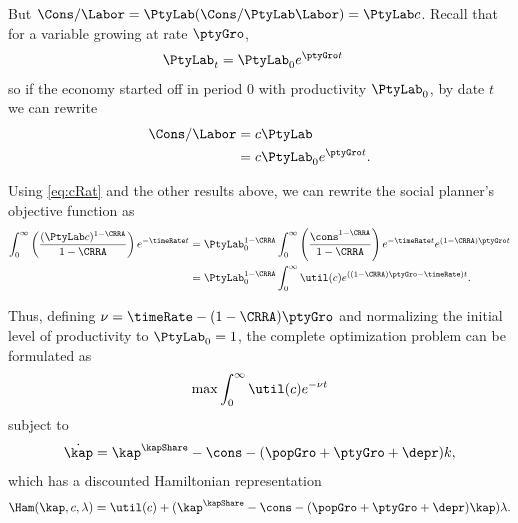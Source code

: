 \documentclass{handout}
\begin{document}
But $\Cons/\Labor = \PtyLab (\Cons/\PtyLab \Labor)= \PtyLab c$.  Recall that for a variable growing at rate $\ptyGro$,
\begin{equation}\begin{gathered}\begin{aligned}
  \PtyLab _{t} & =  \PtyLab _{0}e^{\ptyGro t}
\end{aligned}\end{gathered}\end{equation}
so if the economy started off in period 0 with productivity $\PtyLab_{0}$, by date $t$ we can rewrite
\begin{equation}\begin{gathered}\begin{aligned}
  \Cons/\Labor & =  c\PtyLab   \\
               & =  c\PtyLab _{0}e^{\ptyGro t}. \label{eq:cRat}
\end{aligned}\end{gathered}\end{equation}

Using \eqref{eq:cRat} and the other results above, we can rewrite the social planner's objective function as
\begin{equation}\begin{gathered}\begin{aligned}
  \int_{0}^{\infty} \left(\frac{(\PtyLab c)^{1-\CRRA}}{1-\CRRA}\right) e^{-\timeRate  t} & =  
                                                                                               \PtyLab _{0}^{1-\CRRA}\int_{0}^{\infty} \left(\frac{\cons^{1-\CRRA}}{1-\CRRA}\right) e^{-\timeRate  t}e^{(1-\CRRA)\ptyGro  t} 
  \\ & =  \PtyLab _{0}^{1-\CRRA}\int_{0}^{\infty} \util(c) e^{\left((1-\CRRA)\ptyGro -\timeRate \right) t}
           .
           \label{eq:maxprobmod}
\end{aligned}\end{gathered}\end{equation}

Thus, defining $\nu = \timeRate  - (1-\CRRA) \ptyGro$ and normalizing the initial
level of productivity to $\PtyLab _{0}=1$, the complete optimization problem
can be formulated as
\begin{equation}
  \max \int_{0}^{\infty} \util(c) e^{-\nu  t}
\end{equation}
subject to
\begin{equation}
  \dot{\kap} = \kap^{\kapShare}-\cons-(\popGro+\ptyGro+\depr)k,
\end{equation}
which has a discounted Hamiltonian representation
\begin{equation}
  \Ham(\kap,c,\lambda) = \util(c) + (\kap^{\kapShare} - \cons - (\popGro+\ptyGro+\depr)\kap)\lambda.
\end{equation}
\end{document}
